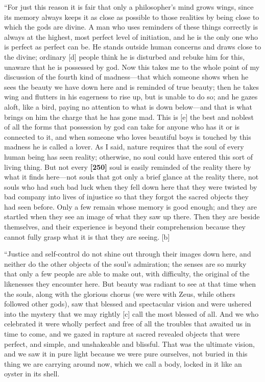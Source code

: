 “For just this reason it is fair that only a philosopher's mind grows
wings, since its memory always keeps it as close as possible to those
realities by being close to which the gods are divine. A man who uses
reminders of these things correctly is always at the highest, most
perfect level of initiation, and he is the only one who is perfect as
perfect can be. He stands outside human concerns and draws close to the
divine; ordinary {[}d{]} people think he is disturbed and rebuke him for
this, unaware that he is possessed by god. Now this takes me to the
whole point of my discussion of the fourth kind of madness---that which
someone shows when he sees the beauty we have down here and is reminded
of true beauty; then he takes wing and flutters in his eagerness to rise
up, but is unable to do so; and he gazes aloft, like a bird, paying no
attention to what is down below---and that is what brings on him the
charge that he has gone mad. This is {[}e{]} the best and noblest of all
the forms that possession by god can take for anyone who has it or is
connected to it, and when someone who loves beautiful boys is touched by
this madness he is called a lover. As I said, nature requires that the
soul of every human being has seen reality; otherwise, no soul could
have entered this sort of living thing. But not every {\bf {[}250{]}}
soul is easily reminded of the reality there by what it finds here---not
souls that got only a brief glance at the reality there, not souls who
had such bad luck when they fell down here that they were twisted by bad
company into lives of injustice so that they forgot the sacred objects
they had seen before. Only a few remain whose memory is good enough; and
they are startled when they see an image of what they saw up there. Then
they are beside themselves, and their experience is beyond their
comprehension because they cannot fully grasp what it is that they are
seeing. {[}b{]}

“Justice and self-control do not shine out through their images down
here, and neither do the other objects of the soul's admiration; the
senses are so murky that only a few people are able to make out, with
difficulty, the original of the likenesses they encounter here. But
beauty was radiant to see at that time when the souls, along with the
glorious chorus (we
were with Zeus, while others followed other gods), saw that blessed and
spectacular vision and were ushered into the mystery that we may rightly
{[}c{]} call the most blessed of all. And we who celebrated it were
wholly perfect and free of all the troubles that awaited us in time to
come, and we gazed in rapture at sacred revealed objects that were
perfect, and simple, and unshakeable and blissful. That was the ultimate
vision, and we saw it in pure light because we were pure ourselves, not
buried in this thing we are carrying around now, which we call a body,
locked in it like an oyster in its shell.

